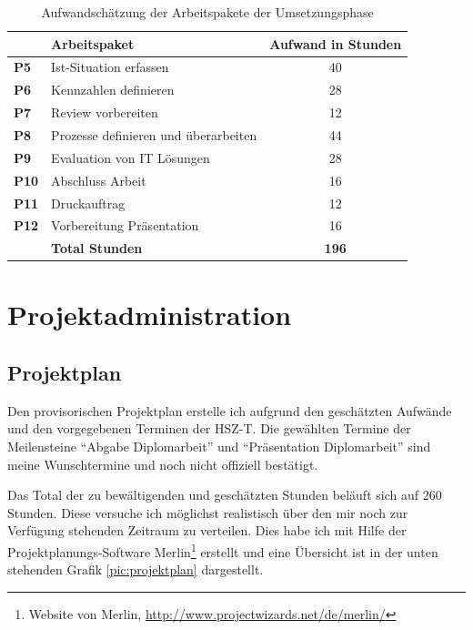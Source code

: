 \begin{table}[h]
\begin{center}
    \begin{tabular}{llc}
        \toprule & \textbf{Arbeitspaket} & \textbf{Aufwand in Stunden} \\
        \midrule \textbf{P5} & Ist-Situation erfassen & 40 \\
        \midrule \textbf{P6} & Kennzahlen definieren & 28 \\
        \midrule \textbf{P7} & Review vorbereiten & 12 \\
        \midrule \textbf{P8} & Prozesse definieren und überarbeiten & 44 \\
        \midrule \textbf{P9} & Evaluation von IT Lösungen & 28 \\
        \midrule \textbf{P10} & Abschluss Arbeit & 16 \\
        \midrule \textbf{P11} & Druckauftrag & 12 \\
        \midrule \textbf{P12} & Vorbereitung Präsentation & 16 \\
        \bottomrule & \textbf{Total Stunden} & \textbf{196} \\
        \bottomrule
    \end{tabular}
    \caption{Aufwandschätzung der Arbeitspakete der Umsetzungsphase}
    \label{tab:aufwand_umsetzungsphase}
\end{center}
\end{table}

\chapter{Projektadministration}
\section{Projektplan}
Den provisorischen Projektplan erstelle ich aufgrund den geschätzten Aufwände
und den vorgegebenen Terminen der HSZ-T. Die gewählten Termine der Meilensteine
``Abgabe Diplomarbeit'' und ``Präsentation Diplomarbeit'' sind meine Wunschtermine
und noch nicht offiziell bestätigt.

Das Total der zu bewältigenden und geschätzten Stunden beläuft sich 
auf 260 Stunden. Diese versuche ich möglichst realistisch über den mir noch
zur Verfügung stehenden Zeitraum zu verteilen. Dies habe ich mit Hilfe der 
Projektplanungs-Software Merlin\footnote{Website von Merlin, \url{http://www.projectwizards.net/de/merlin/}} 
erstellt und eine Übersicht ist in der unten stehenden Grafik \ref{pic:projektplan} 
dargestellt.

